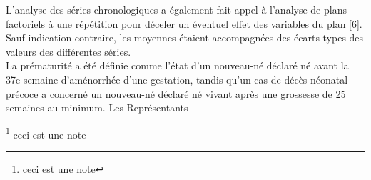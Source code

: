 L’analyse des séries chronologiques a
également fait appel à l’analyse de plans factoriels à une
répétition pour déceler un éventuel effet des variables du plan
[6]. Sauf indication contraire, les moyennes étaient accompagnées
des écarts-types des valeurs des différentes séries.\\

La prématurité a été définie comme l’état d’un nouveau-né
déclaré né avant la 37e semaine d’aménorrhée d’une
gestation, tandis qu’un cas de décès néonatal précoce a
concerné un nouveau-né déclaré né vivant après une
grossesse de 25 semaines au minimum.
Les Représentants



\footnote{ceci est une note} ceci est une note

